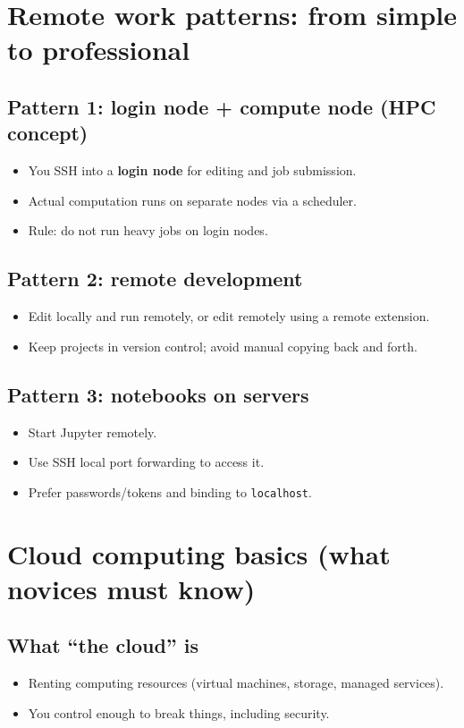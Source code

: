 \section{Remote work patterns: from simple to professional}
\subsection{Pattern 1: login node + compute node (HPC concept)}
\begin{itemize}
\item You SSH into a \textbf{login node} for editing and job submission.
\item Actual computation runs on separate nodes via a scheduler.
\item Rule: do not run heavy jobs on login nodes.
\end{itemize}

\subsection{Pattern 2: remote development}
\begin{itemize}
\item Edit locally and run remotely, or edit remotely using a remote extension.
\item Keep projects in version control; avoid manual copying back and forth.
\end{itemize}

\subsection{Pattern 3: notebooks on servers}
\begin{itemize}
\item Start Jupyter remotely.
\item Use SSH local port forwarding to access it.
\item Prefer passwords/tokens and binding to \texttt{localhost}.
\end{itemize}

\section{Cloud computing basics (what novices must know)}
\subsection{What ``the cloud'' is}
\begin{itemize}
\item Renting computing resources (virtual machines, storage, managed services).
\item You control enough to break things, including security.
\end{itemize}

